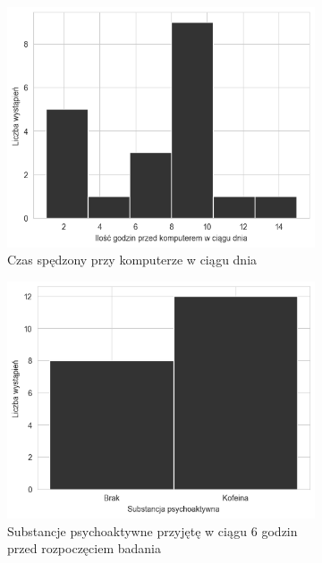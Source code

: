 \documentclass{./assets/wfis}
\begin{document}
\begin{figure}[h!]
\begin{subfigure}[b]{0.45\textwidth}
    \centering
    \includegraphics[width=\columnwidth]{thesis/assets/computer_time.png}
    \caption{Czas spędzony przy komputerze w ciągu dnia}
    \label{fig:computer-time}
\end{subfigure}   
\hfill
\begin{subfigure}[b]{0.45\textwidth}
    \centering
    \includegraphics[width=\columnwidth]{thesis/assets/psychoactive_substance.png}
    \caption{Substancje psychoaktywne przyjętę w ciągu 6 godzin przed rozpoczęciem badania}
    \label{fig:psychoactive-substances}
\end{subfigure}
\begin{subfigure}[b]{\textwidth}
\centering

\end{subfigure}
\end{figure}
\end{document}
